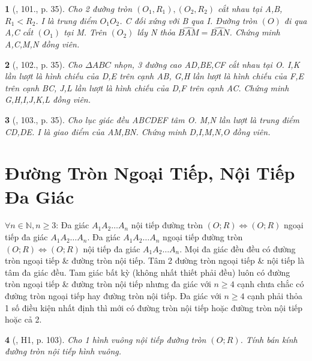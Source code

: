 \documentclass{article}
\newtheorem{baitoan}{}
\begin{document}
\begin{baitoan}[\cite{Thu_Chung_Viet_Minh_circ}, 101., p. 35]
	Cho 2 đường tròn $(O_1,R_1),(O_2,R_2)$ cắt nhau tại A,B, $R_1 < R_2$. I là trung điểm $O_1O_2$. C đối xứng với B qua I. Đường tròn $(O)$ đi qua A,C cắt $(O_1)$ tại M. Trên $(O_2)$ lấy N thỏa $\widehat{BAM} = \widehat{BAN}$. Chứng minh A,C,M,N đồng viên.
\end{baitoan}

\begin{baitoan}[\cite{Thu_Chung_Viet_Minh_circ}, 102., p. 35]
	Cho $\Delta ABC$ nhọn, 3 đường cao AD,BE,CF cắt nhau tại O. I,K lần lượt là hình chiếu của D,E trên cạnh AB, G,H lần lượt là hình chiếu của F,E trên cạnh BC, J,L lần lượt là hình chiếu của D,F trên cạnh AC. Chứng minh G,H,I,J,K,L đồng viên.
\end{baitoan}

\begin{baitoan}[\cite{Thu_Chung_Viet_Minh_circ}, 103., p. 35]
	Cho lục giác đều ABCDEF tâm O. M,N lần lượt là trung điểm CD,DE. I là giao điểm của AM,BN. Chứng minh D,I,M,N,O đồng viên.
\end{baitoan}


\section{Đường Tròn Ngoại Tiếp, Nội Tiếp Đa Giác}
$\forall n\in\mathbb{N},n\ge3$:  Đa giác $A_1A_2\ldots A_n$ nội tiếp đường tròn $(O;R)\Leftrightarrow(O;R)$ ngoại tiếp đa giác $A_1A_2\ldots A_n$.  Đa giác $A_1A_2\ldots A_n$ ngoại tiếp đường tròn $(O;R)\Leftrightarrow(O;R)$ nội tiếp đa giác $A_1A_2\ldots A_n$.  Mọi đa giác đều đều có đường tròn ngoại tiếp \& đường tròn nội tiếp. Tâm 2 đường tròn ngoại tiếp \& nội tiếp là tâm đa giác đều.  Tam giác bất kỳ (không nhất thiết phải đều) luôn có đường tròn ngoại tiếp \& đường tròn nội tiếp nhưng đa giác với $n\ge4$ cạnh chưa chắc có đường tròn ngoại tiếp hay đường tròn nội tiếp. Đa giác với $n\ge4$ cạnh phải thỏa 1 số điều kiện nhất định thì mới có đường tròn nội tiếp hoặc đường tròn nội tiếp hoặc cả 2.

\begin{baitoan}[\cite{Binh_boi_duong_Toan_9_tap_2}, H1, p. 103]
	Cho 1 hình vuông nội tiếp đường tròn $(O;R)$. Tính bán kính đường tròn nội tiếp hình vuông.
\end{baitoan}
\end{document}

